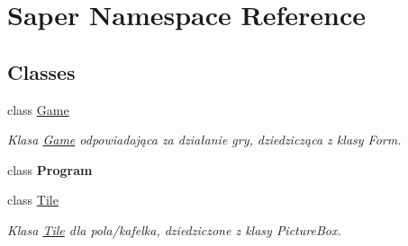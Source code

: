 \hypertarget{namespace_saper}{}\section{Saper Namespace Reference}
\label{namespace_saper}
\subsection*{Classes}
\begin{DoxyCompactItemize}
\item 
class \mbox{\hyperlink{class_saper_1_1_game}{Game}}
\begin{DoxyCompactList}\small\item\em Klasa \mbox{\hyperlink{class_saper_1_1_game}{Game}} odpowiadająca za działanie gry, dziedzicząca z klasy Form. \end{DoxyCompactList}\item 
class {\bfseries Program}
\item 
class \mbox{\hyperlink{class_saper_1_1_tile}{Tile}}
\begin{DoxyCompactList}\small\item\em Klasa \mbox{\hyperlink{class_saper_1_1_tile}{Tile}} dla pola/kafelka, dziedziczone z klasy Picture\+Box. \end{DoxyCompactList}\end{DoxyCompactItemize}
